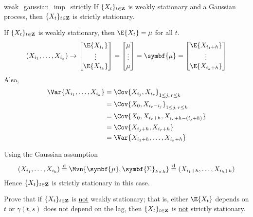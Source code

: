 \begin{Theorem}{}{weak_gaussian_imp_strictly}
    If $ \{X_t\}_{t\in\mathbf{Z}} $ is weakly stationary and a Gaussian process, then
    $ \{X_t\}_{t\in\mathbf{Z}} $ is strictly stationary.
\end{Theorem}
\begin{Proof}{}{}
    If $ \{X_t\}_{t\in\mathbf{Z}} $ is weakly stationary, then $ \E{X_t}=\mu $ for all $ t $.
    \[ (X_{i_1},\ldots,X_{i_k})\rightarrow
        \begin{bmatrix}
            \E{X_{i_1}} \\
            \vdots      \\
            \E{X_{i_k}}
        \end{bmatrix}=\begin{bmatrix}
            \mu    \\
            \vdots \\
            \mu
        \end{bmatrix}=\symbf{\mu}=
        \begin{bmatrix}
            \E{X_{{i_1}+h}} \\
            \vdots          \\
            \E{X_{{i_k}+h}}
        \end{bmatrix} \]
    Also,
    \begin{align*}
        \Var{X_{i_1},\ldots,X_{i_k}}
         & =\Cov{X_{i_j},X_{i_r}}_{1\le j,\, r\le k} \\
         & =\Cov{X_0,X_{i_r-i_j}}_{1\le j,\, r\le k} \\
         & =\Cov{X_0,X_{i_r+h},X_{i_r+h-(i_j+h)}}    \\
         & =\Cov{X_{i_j+h},X_{i_r+h}}                \\
         & =\Var{X_{i_1+h},\ldots,X_{i_k+h}}
    \end{align*}
\end{Proof}
\begin{Example}{}{}
    Using the Gaussian assumption
    \[ (X_{i_1},\ldots,X_{i_k})
        \stackrel{\text{d}}{=}\Mvn{\symbf{\mu},\symbf{\Sigma}_{k\times k}}
        \stackrel{\text{d}}{=}(X_{i_1+h},\ldots,X_{i_k+h}) \]
    Hence $ \{X_{t}\}_{t\in\mathbf{Z}} $ is strictly stationary
    in this case.
\end{Example}
\begin{Exercise}{}{}
    Prove that if $ \{X_t\}_{t\in\mathbf{Z}} $ is \underline{not}
    weakly stationary; that is, either $ \E{X_t} $ depends on $ t $
    or $ \gamma(t,s) $ does not depend on the lag,
    then $ \{X_t\}_{t\in\mathbf{Z}} $ is \underline{not} strictly stationary.
\end{Exercise}

